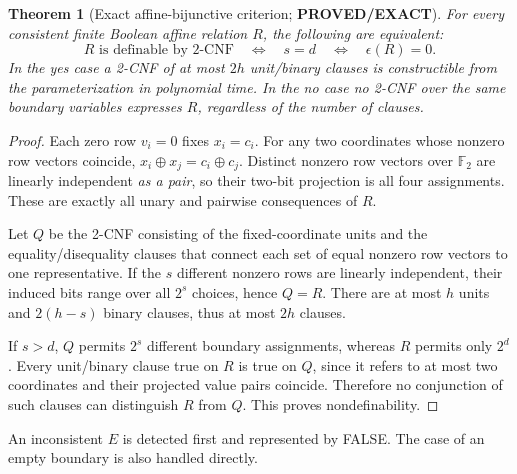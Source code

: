 \documentclass[11pt]{article}
\newtheorem{theorem}{Theorem}
\newcommand{\PROVED}{\textbf{PROVED/EXACT}}
\begin{document}
\begin{theorem}[Exact affine-bijunctive criterion; \PROVED]\label{th:criterion}
For every consistent finite Boolean affine relation $R$,
the following are equivalent:
\[
R\text{ is definable by 2-CNF}
\quad\Longleftrightarrow\quad
s=d
\quad\Longleftrightarrow\quad
\epsilon(R)=0. \tag{4}
\]
In the yes case a 2-CNF of at most $2h$ unit/binary clauses is
constructible from the parameterization in polynomial time. In the no
case no 2-CNF over the \emph{same boundary variables} expresses $R$,
regardless of the number of clauses.
\end{theorem}
\begin{proof}
Each zero row $v_i=0$ fixes $x_i=c_i$. For any two coordinates whose
nonzero row vectors coincide, $x_i\oplus x_j=c_i\oplus c_j$.
Distinct nonzero row vectors over $\mathbb F_2$ are linearly independent
\emph{as a pair}, so their two-bit projection is all four assignments.
These are exactly all unary and pairwise consequences of $R$.

Let $Q$ be the 2-CNF consisting of the fixed-coordinate units and
the equality/disequality clauses that connect each set of equal
nonzero row vectors to one representative. If the $s$ different
nonzero rows are linearly independent, their induced bits range over
all $2^s$ choices, hence $Q=R$. There are at most $h$ units and
$2(h-s)$ binary clauses, thus at most $2h$ clauses.

If $s>d$, $Q$ permits $2^s$ different boundary assignments, whereas
$R$ permits only $2^d$. Every unit/binary clause true on $R$
is true on $Q$, since it refers to at most two coordinates and their
projected value pairs coincide. Therefore no conjunction of such
clauses can distinguish $R$ from $Q$. This proves nondefinability.
\end{proof}
An inconsistent $E$ is detected first and represented by FALSE.
The case of an empty boundary is also handled directly.
\end{document}

